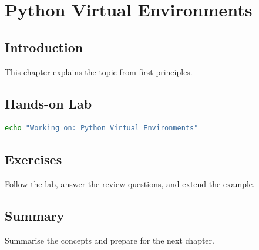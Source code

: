 \chapter{Python Virtual Environments}
\label{chap:vol2-13}



\section{Introduction}
This chapter explains the topic from first principles.

\section{Hands-on Lab}
\begin{lstlisting}[language=bash]
echo "Working on: Python Virtual Environments"
\end{lstlisting}

\section{Exercises}
\begin{exercise}
Follow the lab, answer the review questions, and extend the example.
\end{exercise}

\section{Summary}
Summarise the concepts and prepare for the next chapter.
